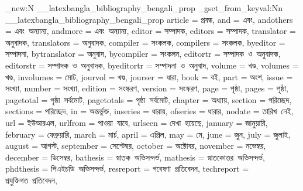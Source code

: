 \prop_new:N \g__latexbangla_bibliography_bengali_prop
\prop_gset_from_keyval:Nn \g__latexbangla_bibliography_bengali_prop
  {
    article = {প্রবন্ধ},
    and = {এবং},
    andothers = {এবং~অন্যান্য},
    andmore = {এবং~অন্যান্য},
    editor = {সম্পাদক},
    editors = {সম্পাদক},
    translator = {অনুবাদক},
    translators = {অনুবাদক},
    compiler = {সংকলক},
    compilers = {সংকলক},
    byeditor = {সম্পাদনা},
    bytranslator = {অনুবাদ},
    bycompiler = {সংকলন},
    editortr = {সম্পাদক~ও~অনুবাদক},
    editorstr = {সম্পাদক~ও~অনুবাদক},
    byeditortr = {সম্পাদনা~ও~অনুবাদ},
    volume = {খণ্ড},
    volumes = {খণ্ড},
    involumes = {মোট},
    jourvol = {খণ্ড},
    jourser = {ধারা},
    book = {বই},
    part = {অংশ},
    issue = {সংখ্যা},
    number = {সংখ্যা},
    edition = {সংস্করণ},
    version = {সংস্করণ},
    page = {পৃষ্ঠা},
    pages = {পৃষ্ঠা},
    pagetotal = {পৃষ্ঠা~সর্বমোট},
    pagetotals = {পৃষ্ঠা~সর্বমোট},
    chapter = {অধ্যায়},
    section = {পরিচ্ছেদ},
    sections = {পরিচ্ছেদ},
    in = {অন্তর্ভুক্ত},
    inseries = {ধারায়},
    ofseries = {ধারার},
    nodate = {তারিখ~নেই},
    url = {ইউআরএল},
    urlfrom = {পাওয়া~যাবে},
    urlseen = {দেখা~হয়েছে},
    january = {জানুয়ারি},
    february = {ফেব্রুয়ারি},
    march = {মার্চ},
    april = {এপ্রিল},
    may = {মে},
    june = {জুন},
    july = {জুলাই},
    august = {আগস্ট},
    september = {সেপ্টেম্বর},
    october = {অক্টোবর},
    november = {নভেম্বর},
    december = {ডিসেম্বর},
    bathesis = {স্নাতক~অভিসন্দর্ভ},
    mathesis = {স্নাতকোত্তর~অভিসন্দর্ভ},
    phdthesis = {পিএইচডি~অভিসন্দর্ভ},
    resreport = {গবেষণা~প্রতিবেদন},
    techreport = {প্রযুক্তিগত~প্রতিবেদন},
  }
\endinput
